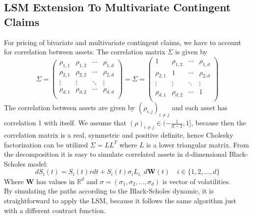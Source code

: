 \subsection{LSM Extension To Multivariate Contingent Claims}
For pricing of bivariate and multivariate contingent claims, we have to account for correlation between assets. The correlation matrix $\Sigma$ is given by
\begin{equation}
\Sigma = \begin{pmatrix}
\rho_{1,1} & \rho_{1,2} & \cdots & \rho_{1,d} \\
\rho_{2,1} & \rho_{2,2} & \cdots & \rho_{2,d} \\
\vdots & \vdots & \ddots & \vdots \\
\rho_{d,1} & \rho_{d,2} & \cdots & \rho_{d,d} \\
\end{pmatrix} = \Sigma = \begin{pmatrix}
1 & \rho_{1,2} & \cdots & \rho_{1,d} \\
\rho_{2,1} & 1 & \cdots & \rho_{2,d} \\
\vdots & \vdots & \ddots & \vdots \\
\rho_{d,1} & \rho_{d,2} & \cdots & 1 \\
\end{pmatrix}
\end{equation}
The correlation between assets are given by $(\rho_{i,j})_{i\neq j}$ and each asset has correlation 1 with itself. We assume that $(\rho)_{i \neq j} \in (-\frac{1}{d-1},1]$, because then the correlation matrix is a real, symmetric and positive definite, hence Cholesky factorization can be utilized $\Sigma=LL^T$ where $L$ is a lower triangular matrix. From the decomposition it is easy to simulate correlated assets in d-dimensional Black-Scholes model:
\begin{equation}
dS_{i}(t)=S_{i}(t) r dt + S_{i}(t) \sigma_i L_{i,\cdot} d\bm{W}(t) \quad i \in \{1,2,\ldots, d\}
\end{equation}
Where $\bm{W}$ has values in $\mathbb{R}^d$ and $\sigma=(\sigma_1, \sigma_2, \ldots, \sigma_d)$ is vector of volatilities.\\

By simulating the paths according to the Black-Scholes dynamic, it is straightforward to apply the LSM, because it follows the same algorithm just with a different contract function.

\newpage


